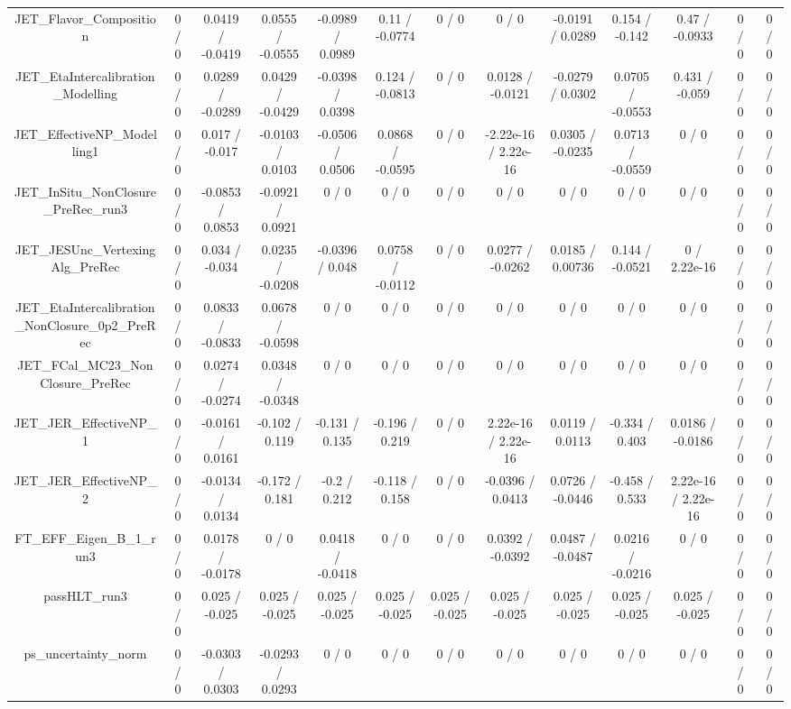 \documentclass[10pt]{article}
\begin{document}
\begin{table}[htbp]
\begin{center}
\begin{tabular}{|c|c|c|c|c|c|c|c|c|c|c|c|c|}
  JET_Flavor_Composition & 0 / 0 & 0.0419 / -0.0419 & 0.0555 / -0.0555 & -0.0989 / 0.0989 & 0.11 / -0.0774 & 0 / 0 & 0 / 0 & -0.0191 / 0.0289 & 0.154 / -0.142 & 0.47 / -0.0933 & 0 / 0 & 0 / 0 \\ 
  JET_EtaIntercalibration_Modelling & 0 / 0 & 0.0289 / -0.0289 & 0.0429 / -0.0429 & -0.0398 / 0.0398 & 0.124 / -0.0813 & 0 / 0 & 0.0128 / -0.0121 & -0.0279 / 0.0302 & 0.0705 / -0.0553 & 0.431 / -0.059 & 0 / 0 & 0 / 0 \\ 
  JET_EffectiveNP_Modelling1 & 0 / 0 & 0.017 / -0.017 & -0.0103 / 0.0103 & -0.0506 / 0.0506 & 0.0868 / -0.0595 & 0 / 0 & -2.22e-16 / 2.22e-16 & 0.0305 / -0.0235 & 0.0713 / -0.0559 & 0 / 0 & 0 / 0 & 0 / 0 \\ 
  JET_InSitu_NonClosure_PreRec_run3 & 0 / 0 & -0.0853 / 0.0853 & -0.0921 / 0.0921 & 0 / 0 & 0 / 0 & 0 / 0 & 0 / 0 & 0 / 0 & 0 / 0 & 0 / 0 & 0 / 0 & 0 / 0 \\ 
  JET_JESUnc_VertexingAlg_PreRec & 0 / 0 & 0.034 / -0.034 & 0.0235 / -0.0208 & -0.0396 / 0.048 & 0.0758 / -0.0112 & 0 / 0 & 0.0277 / -0.0262 & 0.0185 / 0.00736 & 0.144 / -0.0521 & 0 / 2.22e-16 & 0 / 0 & 0 / 0 \\ 
  JET_EtaIntercalibration_NonClosure_0p2_PreRec & 0 / 0 & 0.0833 / -0.0833 & 0.0678 / -0.0598 & 0 / 0 & 0 / 0 & 0 / 0 & 0 / 0 & 0 / 0 & 0 / 0 & 0 / 0 & 0 / 0 & 0 / 0 \\ 
  JET_FCal_MC23_NonClosure_PreRec & 0 / 0 & 0.0274 / -0.0274 & 0.0348 / -0.0348 & 0 / 0 & 0 / 0 & 0 / 0 & 0 / 0 & 0 / 0 & 0 / 0 & 0 / 0 & 0 / 0 & 0 / 0 \\ 
  JET_JER_EffectiveNP_1 & 0 / 0 & -0.0161 / 0.0161 & -0.102 / 0.119 & -0.131 / 0.135 & -0.196 / 0.219 & 0 / 0 & 2.22e-16 / 2.22e-16 & 0.0119 / 0.0113 & -0.334 / 0.403 & 0.0186 / -0.0186 & 0 / 0 & 0 / 0 \\ 
  JET_JER_EffectiveNP_2 & 0 / 0 & -0.0134 / 0.0134 & -0.172 / 0.181 & -0.2 / 0.212 & -0.118 / 0.158 & 0 / 0 & -0.0396 / 0.0413 & 0.0726 / -0.0446 & -0.458 / 0.533 & 2.22e-16 / 2.22e-16 & 0 / 0 & 0 / 0 \\ 
  FT_EFF_Eigen_B_1_run3 & 0 / 0 & 0.0178 / -0.0178 & 0 / 0 & 0.0418 / -0.0418 & 0 / 0 & 0 / 0 & 0.0392 / -0.0392 & 0.0487 / -0.0487 & 0.0216 / -0.0216 & 0 / 0 & 0 / 0 & 0 / 0 \\ 
  passHLT_run3 & 0 / 0 & 0.025 / -0.025 & 0.025 / -0.025 & 0.025 / -0.025 & 0.025 / -0.025 & 0.025 / -0.025 & 0.025 / -0.025 & 0.025 / -0.025 & 0.025 / -0.025 & 0.025 / -0.025 & 0 / 0 & 0 / 0 \\ 
  ps_uncertainty_norm & 0 / 0 & -0.0303 / 0.0303 & -0.0293 / 0.0293 & 0 / 0 & 0 / 0 & 0 / 0 & 0 / 0 & 0 / 0 & 0 / 0 & 0 / 0 & 0 / 0 & 0 / 0 \\ 

\end{tabular}
\end{center}
\end{table}
\end{document}
